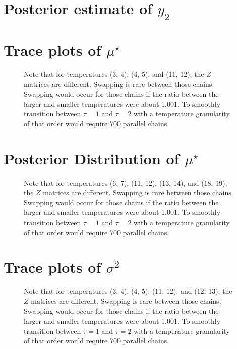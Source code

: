 \documentclass[10pt]{article} %
\begin{document}
\newpage
\section{Posterior estimate of $y_2$}
\begin{figure}[H]
  \begin{center}  %
  \end{center}
  \label{fig:y2est}
\end{figure}


\newpage
\section{Trace plots of $\mu^\star$}
\begin{figure}[H]
  \begin{center}  %
  \end{center}
  \label{fig:mustrace}
  \caption{Note that for temperatures (3, 4), (4, 5), and (11, 12),
  the $Z$ matrices are different. Swapping is rare between those chains.
  Swapping would occur for those chains if the ratio between the larger and smaller
  temperatures were about 1.001. To smoothly transition between $\tau=1$ and
  $\tau=2$ with a temperature granularity of that order would require 700 parallel
  chains.}
\end{figure}

\newpage
\section{Posterior Distribution of $\mu^\star$}
\begin{figure}[H]
  \begin{center}  %
  \end{center}
  \label{fig:mus}
  \caption{Note that for temperatures (6, 7), (11, 12), (13, 14), and (18, 19),
  the $Z$ matrices are different. Swapping is rare between those chains.
  Swapping would occur for those chains if the ratio between the larger and smaller
  temperatures were about 1.001. To smoothly transition between $\tau=1$ and
  $\tau=2$ with a temperature granularity of that order would require 700 parallel
  chains.}
\end{figure}

\newpage
\section{Trace plots of $\sigma^2$}
\begin{figure}[H]
  \begin{center}  %
  \end{center}
  \label{fig:sig2trace}
  \caption{Note that for temperatures (3, 4), (4, 5), (11, 12), and (12, 13),
  the $Z$ matrices are different. Swapping is rare between those chains.
  Swapping would occur for those chains if the ratio between the larger and smaller
  temperatures were about 1.001. To smoothly transition between $\tau=1$ and
  $\tau=2$ with a temperature granularity of that order would require 700 parallel
  chains.}
\end{figure}
\end{document}
